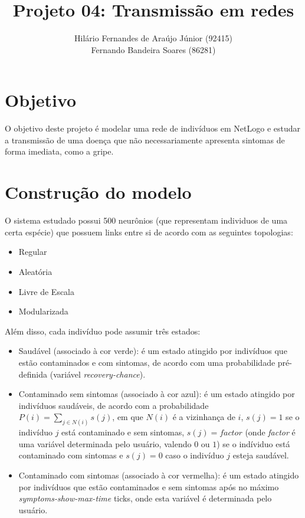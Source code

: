 \documentclass{article}
\title{ \bf   Projeto 04: Transmissão em redes}
\author{Hilário Fernandes de Araújo Júnior (92415)\\
Fernando Bandeira Soares (86281)
}
\begin{document}
\maketitle


\section{Objetivo}
O objetivo deste projeto é modelar uma rede de indivíduos em NetLogo e estudar a transmissão de uma doença que não necessariamente apresenta sintomas de forma imediata, como a gripe.

\section{Construção do modelo}
O sistema estudado possui 500 neurônios (que representam individuos de uma certa espécie) que possuem links entre si de acordo com as seguintes topologias:

\begin{itemize}
\item Regular
\item Aleatória
\item Livre de Escala
\item Modularizada
\end{itemize}

Além disso, cada indivíduo pode assumir três estados: 

\begin{itemize}
\item Saudável (associado à cor verde): é um estado atingido por indivíduos que estão contaminados e com sintomas, de acordo com uma probabilidade pré-definida (variável \textit{recovery-chance}).
\item Contaminado sem sintomas (associado à cor azul): é um estado atingido por indivíduos saudáveis, de acordo com a probabilidade $P(i)=\sum_{j \in N(i)} s(j)$, em que $N(i)$ é a vizinhança de $i$, $s(j) = 1$ se o indivíduo $j$ está contaminado e sem sintomas, $s(j)=factor$ (onde \textit{factor} é uma variável determinada pelo usuário, valendo $0$ ou $1$) se o indíviduo está contaminado com sintomas e $s(j)=0$ caso o indivíduo $j$ esteja saudável.
\item Contaminado com sintomas (associado à cor vermelha): é um estado atingido por indivíduos que estão contaminados e sem sintomas após no máximo \textit{symptoms-show-max-time} ticks, onde esta variável é determinada pelo usuário.
\end{itemize}
\end{document}
